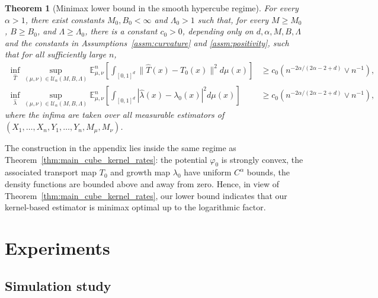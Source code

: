 \documentclass[11pt,reqno]{amsart}
\newtheorem{theorem}{Theorem}
\theoremstyle{definition}
\renewcommand{\hat}{\widehat}
\begin{document}
\begin{theorem}[Minimax lower bound in the smooth hypercube regime]
\label{thm:lb-ubot}
For every $\alpha>1$, there exist constants $M_0,B_0<\infty$ and $\Lambda_0>1$ such that, for every $M\ge M_0$, $B\ge B_0$, and $\Lambda\ge\Lambda_0$, there is a constant $c_0>0$, depending only on $d,\alpha,M,B,\Lambda$ and the constants in Assumptions~\ref{assm:curvature} and \ref{assm:positivity}, such that for all sufficiently large $n$,
\begin{align}
    \inf_{\hat T}
    \sup_{(\mu,\nu)\in\mathcal U_\alpha(M,B,\Lambda)}
    \mathbb E_{\mu,\nu}^n\left[
        \int_{[0,1]^d}\|\hat T(x)-T_0(x)\|^2 d\mu(x)
    \right]
    &\ge
    c_0\left(
        n^{ -2\alpha/(2\alpha-2+d)}
        \vee
        n^{-1}
    \right),\\
    \inf_{\hat\lambda}
    \sup_{(\mu,\nu)\in\mathcal U_\alpha(M,B,\Lambda)}
    \mathbb E_{\mu,\nu}^n\left[
        \int_{[0,1]^d}|\hat\lambda(x)-\lambda_0(x)|^2 d\mu(x)
    \right]
    &\ge
    c_0\left(
        n^{ -2\alpha/(2\alpha-2+d)}
        \vee
        n^{-1}
    \right),
\end{align}
where the infima are taken over all measurable estimators of $(X_1,\dots,X_n,Y_1,\dots,Y_n,M_\mu,M_\nu)$.
\end{theorem}

The construction in the appendix lies inside the same regime as Theorem~\ref{thm:main_cube_kernel_rates}: the potential $\varphi_0$ is strongly convex, the associated transport map $T_0$ and growth map $\lambda_0$ have uniform $C^\alpha$ bounds, the density functions are bounded above and away from zero. Hence, in view of Theorem~\ref{thm:main_cube_kernel_rates}, our lower bound indicates that our kernel-based estimator is minimax optimal up to the logarithmic factor.





\section{Experiments}

\subsection{Simulation study}
\end{document}
